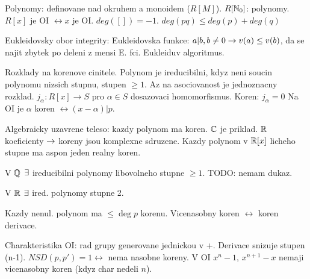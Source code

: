Polynomy: definovane nad okruhem a monoidem ($R[M]$). $R[\mathbb{N}_0]$: polynomy.
$R[x]$ je OI $\leftrightarrow x$ je OI.
$deg([])=-1$. $deg(pq)\leq deg(p)+deg(q)$

Eukleidovsky obor integrity: Eukleidovska funkce: $a|b,b\neq 0\rightarrow v(a)\leq
v(b)$, da se najit zbytek po deleni z mensi E. fci. Eukleiduv algoritmus.

Rozklady na korenove cinitele.
Polynom je ireducibilni, kdyz neni soucin polynomu nizsich stupnu, stupen $\geq
1$. Az na asociovanost je jednoznacny rozklad.
$j_\alpha:R[x]\rightarrow S$ pro $\alpha\in S$ dosazovaci homomorfismus.
Koren: $j_\alpha=0$
Na OI je $\alpha$ koren $\leftrightarrow (x-\alpha)|p$.

Algebraicky uzavrene teleso: kazdy polynom ma koren.
$\mathbb{C}$ je priklad. $\mathbb{R}$ koeficienty $\rightarrow$ koreny jsou komplexne sdruzene.
Kazdy polynom v $\mathbb{R}[x]$ licheho stupne ma aspon jeden realny koren.

V $\mathbb{Q}$ $\exists$ ireducibilni polynomy libovolneho stupne $\geq 1$.
TODO: nemam dukaz.

V $\mathbb{R}$ $\exists$ ired. polynomy stupne 2.

Kazdy nenul. polynom ma $\leq\deg p$ korenu. Vicenasobny koren
$\leftrightarrow$ koren derivace.

Charakteristika OI: rad grupy generovane jednickou v +.
Derivace snizuje stupen (n-1).
$NSD(p,p')=1\leftrightarrow$ nema nasobne koreny.
V OI $x^n-1$, $x^{n+1}-x$ nemaji vicenasobny koren (kdyz char nedeli $n$).
